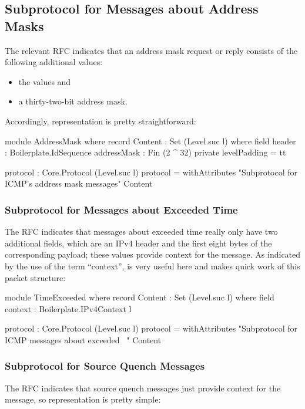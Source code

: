 \documentclass{report}
\begin{document}
\begin{itemize}
\section{Subprotocol for Messages about Address Masks}
The relevant RFC indicates that an address mask request or reply consists of the following additional values:

\begin{itemize}
\item the  values and
\item a thirty-two-bit address mask.
\end{itemize}

Accordingly, representation is pretty straightforward:

\begin{code}
    module AddressMask where
      record Content : Set (Level.suc l) where
        field
          header : Boilerplate.IdSequence
          addressMask : Fin (2 ^ 32)
        private
          levelPadding = tt

      protocol : Core.Protocol (Level.suc l)
      protocol = withAttributes "Subprotocol for ICMP's address mask messages"
                                Content
\end{code}

\subsubsection{Subprotocol for Messages about Exceeded Time}
The RFC indicates that messages about exceeded time really only have two additional fields, which are an IPv4 header and the first eight bytes of the corresponding payload; these values provide context for the message.  As indicated by the use of the term ``context'',  is very useful here and makes quick work of this packet structure:

\begin{code}
    module TimeExceeded where
      record Content : Set (Level.suc l) where
        field
          context : Boilerplate.IPv4Context l

      protocol : Core.Protocol (Level.suc l)
      protocol = withAttributes "Subprotocol for ICMP messages about exceeded \
                                \time"
                                Content
\end{code}

\subsubsection{Subprotocol for Source Quench Messages}
The RFC indicates that source quench messages just provide context for the message, so representation is pretty simple:


\end{itemize}
\end{document}
